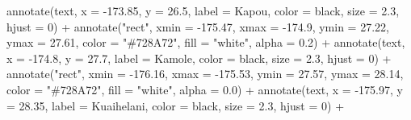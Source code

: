 \documentclass[
]{article}
\newenvironment{Shaded}{\begin{snugshade}}{\end{snugshade}}
\newcommand{\AttributeTok}[1]{\textcolor[rgb]{0.77,0.63,0.00}{#1}}
\newcommand{\DecValTok}[1]{\textcolor[rgb]{0.00,0.00,0.81}{#1}}
\newcommand{\FloatTok}[1]{\textcolor[rgb]{0.00,0.00,0.81}{#1}}
\newcommand{\FunctionTok}[1]{\textcolor[rgb]{0.00,0.00,0.00}{#1}}
\newcommand{\NormalTok}[1]{#1}
\newcommand{\SpecialCharTok}[1]{\textcolor[rgb]{0.00,0.00,0.00}{#1}}
\newcommand{\StringTok}[1]{\textcolor[rgb]{0.31,0.60,0.02}{#1}}
\begin{document}
\begin{Shaded}
\begin{Highlighting}[]
  \FunctionTok{annotate}\NormalTok{(}\StringTok{\textquotesingle{}text\textquotesingle{}}\NormalTok{, }\AttributeTok{x =} \SpecialCharTok{{-}}\FloatTok{173.85}\NormalTok{, }\AttributeTok{y =} \FloatTok{26.5}\NormalTok{, }
           \AttributeTok{label =} \StringTok{\textquotesingle{}Kapou\textquotesingle{}}\NormalTok{, }\AttributeTok{color =} \StringTok{\textquotesingle{}black\textquotesingle{}}\NormalTok{, }\AttributeTok{size =} \FloatTok{2.3}\NormalTok{, }\AttributeTok{hjust =} \DecValTok{0}\NormalTok{) }\SpecialCharTok{+}
  \FunctionTok{annotate}\NormalTok{(}\StringTok{"rect"}\NormalTok{, }\AttributeTok{xmin =} \SpecialCharTok{{-}}\FloatTok{175.47}\NormalTok{, }\AttributeTok{xmax =} \SpecialCharTok{{-}}\FloatTok{174.9}\NormalTok{, }\AttributeTok{ymin =} \FloatTok{27.22}\NormalTok{, }\AttributeTok{ymax =} \FloatTok{27.61}\NormalTok{, }
           \AttributeTok{color =} \StringTok{"\#728A72"}\NormalTok{, }\AttributeTok{fill =} \StringTok{"white"}\NormalTok{, }\AttributeTok{alpha =} \FloatTok{0.2}\NormalTok{) }\SpecialCharTok{+}
  \FunctionTok{annotate}\NormalTok{(}\StringTok{\textquotesingle{}text\textquotesingle{}}\NormalTok{, }\AttributeTok{x =} \SpecialCharTok{{-}}\FloatTok{174.8}\NormalTok{, }\AttributeTok{y =} \FloatTok{27.7}\NormalTok{, }
           \AttributeTok{label =} \StringTok{\textquotesingle{}Kamole\textquotesingle{}}\NormalTok{, }\AttributeTok{color =} \StringTok{\textquotesingle{}black\textquotesingle{}}\NormalTok{, }\AttributeTok{size =} \FloatTok{2.3}\NormalTok{, }\AttributeTok{hjust =} \DecValTok{0}\NormalTok{) }\SpecialCharTok{+}
  \FunctionTok{annotate}\NormalTok{(}\StringTok{"rect"}\NormalTok{, }\AttributeTok{xmin =} \SpecialCharTok{{-}}\FloatTok{176.16}\NormalTok{, }\AttributeTok{xmax =} \SpecialCharTok{{-}}\FloatTok{175.53}\NormalTok{, }\AttributeTok{ymin =} \FloatTok{27.57}\NormalTok{, }\AttributeTok{ymax =} \FloatTok{28.14}\NormalTok{, }
           \AttributeTok{color =} \StringTok{"\#728A72"}\NormalTok{, }\AttributeTok{fill =} \StringTok{"white"}\NormalTok{, }\AttributeTok{alpha =} \FloatTok{0.0}\NormalTok{) }\SpecialCharTok{+}
  \FunctionTok{annotate}\NormalTok{(}\StringTok{\textquotesingle{}text\textquotesingle{}}\NormalTok{, }\AttributeTok{x =} \SpecialCharTok{{-}}\FloatTok{175.97}\NormalTok{, }\AttributeTok{y =} \FloatTok{28.35}\NormalTok{, }
           \AttributeTok{label =} \StringTok{\textquotesingle{}Kuaihelani\textquotesingle{}}\NormalTok{, }\AttributeTok{color =} \StringTok{\textquotesingle{}black\textquotesingle{}}\NormalTok{, }\AttributeTok{size =} \FloatTok{2.3}\NormalTok{, }\AttributeTok{hjust =} \DecValTok{0}\NormalTok{) }\SpecialCharTok{+}

\end{Highlighting}
\end{Shaded}
\end{document}
